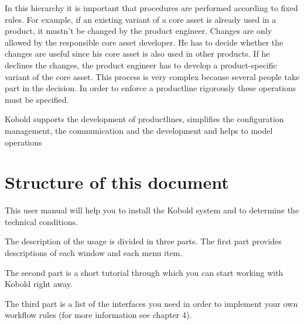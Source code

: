 In this hierarchy it is important that procedures are performed according to fixed
rules. For example, if an existing variant of a core asset is already used in
a product, it mustn't be changed by the product engineer. Changes are only
allowed by the responsible core asset developer. He has to decide whether the
changes are useful since his core asset is also used in other products. If he declines
the changes, the product engineer has to develop a product-specific variant of the
core asset. This process is very complex because several people take part in 
the decision. In order to enforce a productline rigorously these operations must
be specified. \par

Kobold supports the development of productlines, simplifies the configuration
management, the communication and the development and helps to model 
operations



\section{Structure of this document}
This user manual will help you to install the Kobold system and to
determine the technical conditions. \par
The description of the usage is divided in three parts. The first part provides descriptions of each window and
each menu item. 
\par
The second part is a short tutorial through which you can start working with Kobold right away.\par
The third part is a list of the interfaces you need in order to implement your own workflow
rules (for more information see chapter 4).